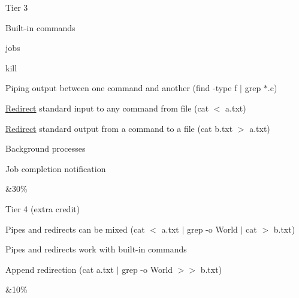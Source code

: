 \begin{longtabu}
\begin{DoxyItemize}
\item Tier 3  
\begin{DoxyItemize}
\item Built-\/in commands  
\begin{DoxyItemize}
\item jobs  
\item kill  
\end{DoxyItemize}
\item Piping output between one command and another (find -\/type f $|$ grep \textquotesingle{}$\ast$.c\textquotesingle{})  
\item \hyperlink{structRedirect}{Redirect} standard input to any command from file (cat $<$ a.\+txt)  
\item \hyperlink{structRedirect}{Redirect} standard output from a command to a file (cat b.\+txt $>$ a.\+txt)  
\item Background processes  
\begin{DoxyItemize}
\item Job completion notification  
\end{DoxyItemize}
\end{DoxyItemize}
\end{DoxyItemize}&30\%   \\

\begin{DoxyItemize}
\item Tier 4 (extra credit)  
\begin{DoxyItemize}
\item Pipes and redirects can be mixed (cat $<$ a.\+txt $|$ grep -\/o World $|$ cat $>$ b.\+txt)  
\item Pipes and redirects work with built-\/in commands  
\item Append redirection (cat a.\+txt $|$ grep -\/o World $>$$>$ b.\+txt)  
\end{DoxyItemize}
\end{DoxyItemize}&10\%   \\


\end{longtabu}
